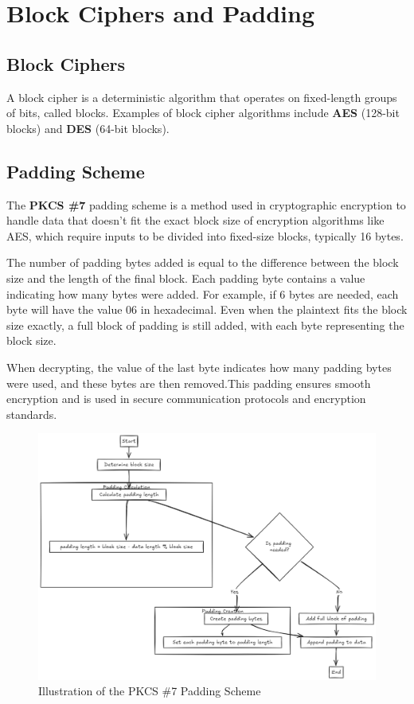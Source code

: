 \documentclass[conference]{IEEEtran}
\begin{document}
\section{Block Ciphers and Padding}
\subsection{Block Ciphers}
A block cipher is a deterministic algorithm that operates on fixed-length groups of bits, called blocks. Examples of block cipher algorithms include {\bf AES} (128-bit blocks) and {\bf DES} (64-bit blocks). 

\subsection{Padding Scheme}
The {\bf PKCS \#7} padding scheme is a method used in cryptographic encryption to handle data that doesn’t fit the exact block size of encryption algorithms like AES, which require inputs to be divided into fixed-size blocks, typically 16 bytes.

The number of padding bytes added is equal to the difference between the block size and the length of the final block. Each padding byte contains a value indicating how many bytes were added. For example, if 6 bytes are needed, each byte will have the value 06 in hexadecimal. Even when the plaintext fits the block size exactly, a full block of padding is still added, with each byte representing the block size.

When decrypting, the value of the last byte indicates how many padding bytes were used, and these bytes are then removed.This padding ensures smooth encryption and is used in secure communication protocols and encryption standards.

\begin{figure}[!htb]
    \centering
    \includegraphics[width=\linewidth]{padding.png}
    \caption{Illustration of the PKCS \#7 Padding Scheme}
    \label{fig:padding-scheme}
\end{figure}
\end{document}

